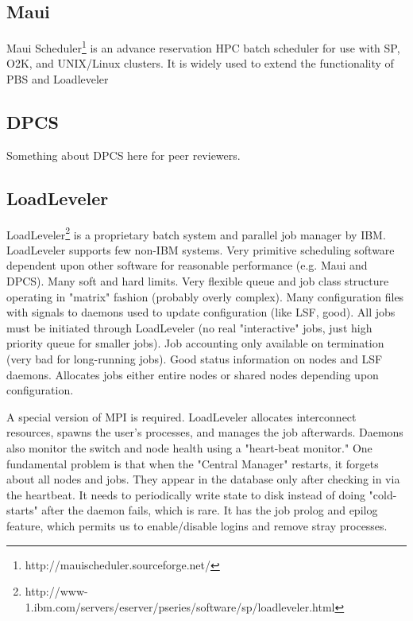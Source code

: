 \subsection{Maui}

Maui Scheduler\footnote{http://mauischeduler.sourceforge.net/}
is an advance reservation HPC batch scheduler for use with SP, 
O2K, and UNIX/Linux clusters. It is widely used to extend the 
functionality of PBS and Loadleveler

\subsection{DPCS}

Something about DPCS here for peer reviewers.

\subsection{LoadLeveler}

LoadLeveler\footnote{
http://www-1.ibm.com/servers/eserver/pseries/software/sp/loadleveler.html}
 is a proprietary batch system and parallel job manager by 
IBM. LoadLeveler supports few non-IBM systems. Very primitive 
scheduling software dependent upon other software for reasonable 
performance (e.g. Maui and DPCS). Many soft and hard limits. Very 
flexible queue and job class structure operating in "matrix" fashion 
(probably overly complex). Many configuration files with signals to 
daemons used to update configuration (like LSF, good). All jobs must 
be initiated through LoadLeveler (no real "interactive" jobs, just 
high priority queue for smaller jobs). Job accounting only available 
on termination (very bad for long-running jobs). Good status 
information on nodes and LSF daemons. Allocates jobs either entire 
nodes or shared nodes depending upon configuration.

A special version of MPI is required. LoadLeveler allocates 
interconnect resources, spawns the user's processes, and manages the 
job afterwards. Daemons also monitor the switch and node health using 
a "heart-beat monitor." One fundamental problem is that when the 
"Central Manager" restarts, it forgets about all nodes and jobs. They 
appear in the database only after checking in via the heartbeat. It 
needs to periodically write state to disk instead of doing 
"cold-starts" after the daemon fails, which is rare. It has the job 
prolog and epilog feature, which permits us to enable/disable logins 
and remove stray processes.


